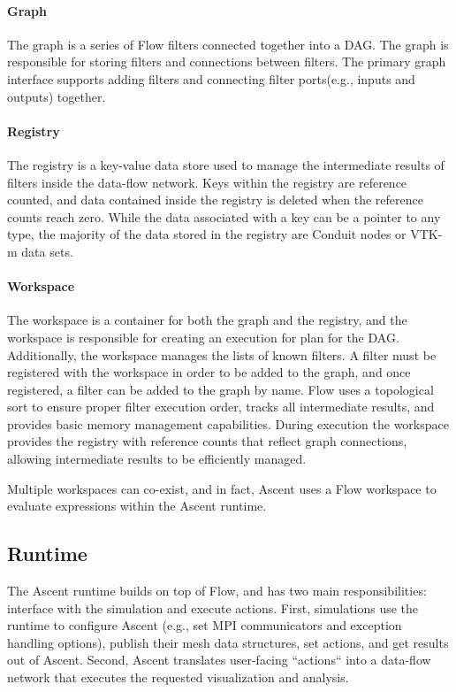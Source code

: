 \paragraph{Graph}
The graph is a series of Flow filters connected together into
a DAG.
%
The graph is responsible for storing filters and connections
between filters.
%
The primary graph interface supports adding filters and connecting
filter ports(e.g., inputs and outputs) together.

\paragraph{Registry}
The registry is a key-value data store used to manage the intermediate
results of filters inside the data-flow network.
%
Keys within the registry are reference counted, and data contained
inside the registry is deleted when the reference counts reach zero.
%
While the data associated with a key can be a pointer to any type,
the majority of the data stored in the registry are Conduit nodes
or VTK-m data sets.


\paragraph{Workspace}
The workspace is a container for both the graph and the registry,
and the workspace is responsible for creating an execution for plan
for the DAG.
%
Additionally, the workspace manages the lists of known filters.
%
A filter must be registered with the workspace in order to be added to the
graph, and once registered, a filter can be added to the graph by name.
%
Flow uses a topological sort to ensure proper filter execution order,
tracks all intermediate results, and provides basic memory management capabilities.
During execution the workspace provides the registry with reference counts that reflect graph connections, allowing intermediate results to be efficiently managed.

%
Multiple workspaces can co-exist, and in fact, Ascent uses a Flow workspace
to evaluate expressions within the Ascent runtime.
%

\subsection{Runtime}
The Ascent runtime builds on top of Flow, and has two main responsibilities:
interface with the simulation and execute actions.
%
First, simulations use the runtime to configure Ascent (e.g., set MPI communicators and
exception handling options), publish their mesh data structures, set actions,
and get results out of Ascent.
%
Second, Ascent translates user-facing ``actions`` into a data-flow network that executes the requested visualization and analysis.
%

